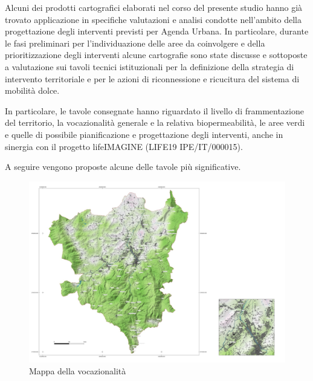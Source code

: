 \documentclass[
]{book}
\begin{document}
Alcuni dei prodotti cartografici elaborati nel corso del presente studio hanno già trovato applicazione in specifiche valutazioni e analisi condotte nell'ambito della progettazione degli interventi previsti per Agenda Urbana.
In particolare, durante le fasi preliminari per l'individuazione delle aree da coinvolgere e della prioritizzazione degli interventi alcune cartografie sono state discusse e sottoposte a valutazione sui tavoli tecnici istituzionali per la definizione della strategia di intervento territoriale e per le azioni di riconnessione e ricucitura del sistema di mobilità dolce.

In particolare, le tavole consegnate hanno riguardato il livello di frammentazione del territorio, la vocazionalità generale e la relativa biopermeabilità, le aree verdi e quelle di possibile pianificazione e progettazione degli interventi, anche in sinergia con il progetto lifeIMAGINE (LIFE19 IPE/IT/000015).

A seguire vengono proposte alcune delle tavole più significative.

\begin{figure}

{\centering \includegraphics[width=\linewidth]{./figs/agendaUrbana/mappaSuitability20240619} 

}

\caption{Mappa della vocazionalità}\label{fig:agUsuit}
\end{figure}
\end{document}
